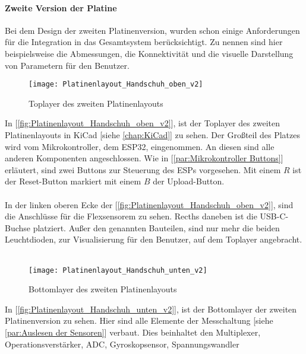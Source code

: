 \documentclass[titlepage,12pt,twoside]{article}
\begin{document}
\paragraph{Zweite Version der Platine}
\hfill \break
\hfill \break
Bei dem Design der zweiten Platinenversion, wurden schon einige Anforderungen für die Integration in das Gesamtsystem
berücksichtigt. Zu nennen sind hier beispielsweise die Abmessungen, die Konnektivität und die visuelle Darstellung 
von Parametern für den Benutzer. 

\begin{figure}[H]
	\begin{center}
		\scalebox{0.6}
		{\texttt{[image: Platinenlayout\_Handschuh\_oben\_v2]}}
		\caption{Toplayer des zweiten Platinenlayouts}
		\label{fig:Platinenlayout_Handschuh_oben_v2}		
	\end{center}
\end{figure}
\hfill \break
In [\textcolor{blue}{\autoref{fig:Platinenlayout_Handschuh_oben_v2}}], ist der Toplayer des zweiten Platinenlayouts in KiCad [siehe \textcolor{blue}{\autoref{chap:KiCad}}] zu sehen.
Der Großteil des Platzes wird vom Mikrokontroller, dem ESP32, eingenommen. An diesen sind alle anderen Komponenten angeschlossen. Wie in 
[\textcolor{blue}{\autoref{par:Mikrokontroller Buttons}}] erläutert, sind zwei Buttons zur Steuerung des ESPs vorgesehen. Mit einem $R$ ist der Reset-Button markiert
mit einem $B$ der Upload-Button. \\
\\
In der linken oberen Ecke der [\textcolor{blue}{\autoref{fig:Platinenlayout_Handschuh_oben_v2}}], sind die Anschlüsse für die Flexsensorem zu sehen. Recths daneben
ist die USB-C-Buchse platziert. Außer den genannten Bauteilen, sind nur mehr die beiden Leuchtdioden, zur Visualisierung für den Benutzer, auf dem 
Toplayer angebracht. \\
\\
\begin{figure}[H]
	\begin{center}
		\scalebox{0.6}
		{\texttt{[image: Platinenlayout\_Handschuh\_unten\_v2]}}
		\caption{Bottomlayer des zweiten Platinenlayouts}
		\label{fig:Platinenlayout_Handschuh_unten_v2}		
	\end{center}
\end{figure}
\hfill \break
In [\textcolor{blue}{\autoref{fig:Platinenlayout_Handschuh_unten_v2}}], ist der Bottomlayer der zweiten Platinenversion zu sehen. Hier sind alle Elemente der Messchaltung
[siehe \textcolor{blue}{\autoref{par:Auslesen der Sensoren}}] verbaut. Dies beinhaltet den Multiplexer, Operationsverstärker, ADC, Gyroskopsensor, Spannungswandler
\end{document}
